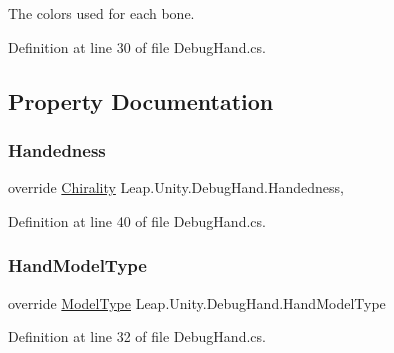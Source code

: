 The colors used for each bone. 

Definition at line 30 of file Debug\+Hand.\+cs.



\subsection{Property Documentation}
\mbox{\label{class_leap_1_1_unity_1_1_debug_hand_a28c11b6ea4043f473e856168d5af15fa}} 
\subsubsection{\texorpdfstring{Handedness}{Handedness}}
{\footnotesize\ttfamily override \mbox{\hyperlink{namespace_leap_1_1_unity_a4d15adcf20ba121b2cd9c07f503b606f}{Chirality}} Leap.\+Unity.\+Debug\+Hand.\+Handedness\hspace{0.3cm}{\ttfamily [get]}, {\ttfamily [set]}}



Definition at line 40 of file Debug\+Hand.\+cs.

\mbox{\label{class_leap_1_1_unity_1_1_debug_hand_aa83762c9f8d2288619683ea6c423dda3}} 
\subsubsection{\texorpdfstring{HandModelType}{HandModelType}}
{\footnotesize\ttfamily override \mbox{\hyperlink{namespace_leap_1_1_unity_a186e5eb0a2b743f1f6b79346f0ab8ad0}{Model\+Type}} Leap.\+Unity.\+Debug\+Hand.\+Hand\+Model\+Type\hspace{0.3cm}{\ttfamily [get]}}



Definition at line 32 of file Debug\+Hand.\+cs.

\mbox{\label{class_leap_1_1_unity_1_1_debug_hand_ae5f9ba1586c260729c18963e5ce2bd92}} 
